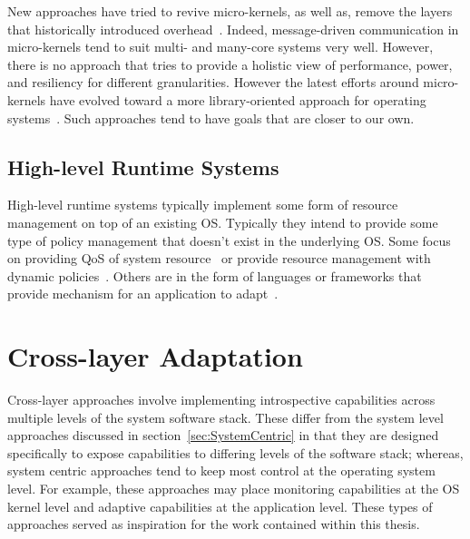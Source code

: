         New approaches have tried to revive micro-kernels, as well as, remove the layers that historically introduced overhead~\cite{AppavooEtAl05,KriegerEtAl06,NightingaleEtAl09,SachaEtAl12}. Indeed, message-driven communication in micro-kernels tend to suit multi- and many-core systems very well. However, there is no approach that tries to provide a holistic view of performance, power, and resiliency for different granularities. However the latest efforts around micro-kernels have evolved toward a more library-oriented approach for operating systems~\cite{AmmonsEtAl07}. Such approaches tend to have goals that are closer to our own.

    \subsection{High-level Runtime Systems}
        High-level runtime systems typically implement some form of resource management on top of an existing OS. Typically they intend to provide some type of policy management that doesn't exist in the underlying OS. Some focus on providing QoS of system resource~\cite{LiNahrstedt2001, LiEtAl2006, Sharifi2011} or provide resource management with dynamic policies~\cite{ZhangEtAl2002}. Others are in the form of languages or frameworks that provide mechanism for an application to adapt~\cite{ChangKaramcheti2000, HollingsworthEtAl1998, RiblerEtAl1998, SironiEtAl2012}.

\section{Cross-layer Adaptation}
    Cross-layer approaches involve implementing introspective capabilities across multiple levels of the system software stack. These differ from the system level approaches discussed in section~\ref{sec:SystemCentric} in that they are designed specifically to expose capabilities to differing levels of the software stack; whereas, system centric approaches tend to keep most control at the operating system level. For example, these approaches may place monitoring capabilities at the OS kernel level and adaptive capabilities at the application level. These types of approaches served as inspiration for the work contained within this thesis.
    
